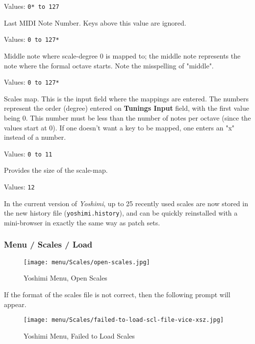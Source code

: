    Values: \texttt{0* to 127}

   Last MIDI Note Number.
   Keys above this value are ignored.

   Values: \texttt{0 to 127*}

   Middle note where scale-degree 0 is mapped to;
   the middle note represents the note where the formal octave starts.
   Note the misspelling of "middle".

   Values: \texttt{0 to 127*}

   Scales map.  This is the input field where the mappings are entered.
   The numbers represent the order (degree) entered on
   \textbf{Tunings Input} field, with the first value being 0.
   This number must be less than the number of notes per octave (since
   the values start at 0).
   If one doesn't want a key to be mapped, one enters an "x" instead of a
   number.

   Values: \texttt{0 to 11}

   Provides the size of the scale-map.

   Values: \texttt{12}

   In the current version of \textsl{Yoshimi}, up to 25 recently used scales are
   now stored in the new history file
   (\texttt{yoshimi.history}), and can be quickly reinstalled with a
   mini-browser in exactly the same way as patch sets.

\subsubsection{Menu / Scales / Load}
\label{subsec:menu_scales_load}

\begin{figure}[H]
   \centering 
   \texttt{[image: menu/Scales/open-scales.jpg]}
   \caption{Yoshimi Menu, Open Scales}
   \label{fig:yoshimi_menu_open_scales}
\end{figure}

   If the format of the scales file is not correct, then the following prompt
   will appear.

\begin{figure}[H]
   \centering 
   \texttt{[image: menu/Scales/failed-to-load-scl-file-vice-xsz.jpg]}
   \caption{Yoshimi Menu, Failed to Load Scales}
   \label{fig:yoshimi_menu_failed_to_load_scales}
\end{figure}


